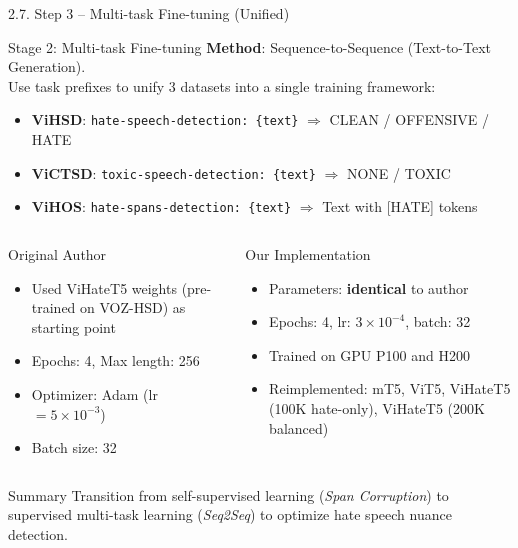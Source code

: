 \documentclass[11pt, aspectratio=169]{beamer}
\begin{document}
\begin{frame}[shrink=5]{2.7. Step 3 -- Multi-task Fine-tuning (Unified)}

\begin{block}{Stage 2: Multi-task Fine-tuning}
  \textbf{Method}: Sequence-to-Sequence (Text-to-Text Generation).\\
  Use task prefixes to unify 3 datasets into a single training framework:
  \begin{itemize}
    \item \textbf{ViHSD}: \texttt{hate-speech-detection: \{text\}} $\Rightarrow$ CLEAN / OFFENSIVE / HATE
    \item \textbf{ViCTSD}: \texttt{toxic-speech-detection: \{text\}} $\Rightarrow$ NONE / TOXIC
    \item \textbf{ViHOS}: \texttt{hate-spans-detection: \{text\}} $\Rightarrow$ Text with [HATE] tokens
  \end{itemize}
\end{block}

\vspace{0.2cm}
\begin{columns}[T]
  \begin{block}{Original Author}
    \begin{itemize}
      \item Used ViHateT5 weights (pre-trained on VOZ-HSD) as starting point
      \item Epochs: 4, Max length: 256
      \item Optimizer: Adam (lr $= 5 \times 10^{-3}$)
      \item Batch size: 32
    \end{itemize}
  \end{block}

  \begin{block}{Our Implementation}
    \begin{itemize}
      \item Parameters: \textbf{identical} to author
      \item Epochs: 4, lr: $3 \times 10^{-4}$, batch: 32
      \item Trained on GPU P100 and H200
      \item Reimplemented: mT5, ViT5, ViHateT5 (100K hate-only), ViHateT5 (200K balanced)
    \end{itemize}
  \end{block}
\end{columns}

\vspace{0.2cm}
\begin{block}{Summary}
  Transition from self-supervised learning (\textit{Span Corruption}) to supervised multi-task learning (\textit{Seq2Seq}) to optimize hate speech nuance detection.
\end{block}
\end{frame}
\end{document}
